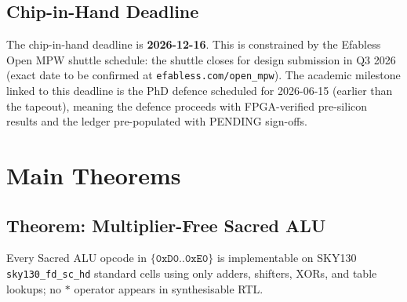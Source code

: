 \subsection{Chip-in-Hand Deadline}
\label{subsec:72:chip-in-hand}

The chip-in-hand deadline is \textbf{2026-12-16}.
This is constrained by the Efabless Open MPW shuttle schedule:
the shuttle closes for design submission in Q3 2026 (exact date
to be confirmed at \texttt{efabless.com/open\_mpw}).
The academic milestone linked to this deadline is the PhD defence
scheduled for 2026-06-15 (earlier than the tapeout), meaning
the defence proceeds with FPGA-verified pre-silicon results
and the ledger pre-populated with PENDING sign-offs.

\section{Main Theorems}
\label{sec:72:theorems}

\subsection{Theorem: Multiplier-Free Sacred ALU}
\label{subsec:72:thm-mult-free}

\begin{theorem}
\label{thm:sky130-no-mult}
Every Sacred ALU opcode in $\{\mathtt{0xD0}..\mathtt{0xE0}\}$ is
implementable on \textup{SKY130} \texttt{sky130\_fd\_sc\_hd} standard
cells using only adders, shifters, XORs, and table lookups; no
$\mathtt{*}$ operator appears in synthesisable RTL.
\end{theorem}

